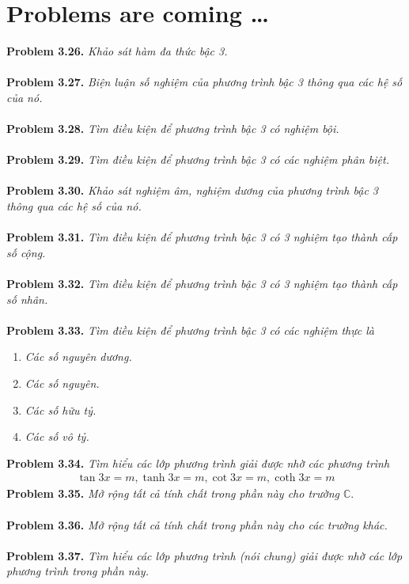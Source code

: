 \documentclass[a4paper,oneside]{book}
\numberwithin{equation}{chapter}
\begin{document}
\section{Problems are coming \ldots}
\textbf{Problem 3.26.} \textit{Khảo sát hàm đa thức bậc 3.}\\
\\
\textbf{Problem 3.27.} \textit{Biện luận số nghiệm của phương trình bậc 3 thông qua các hệ số của nó.}\\
\\
\textbf{Problem 3.28.} \textit{Tìm điều kiện để phương trình bậc 3 có nghiệm bội.}\\
\\
\textbf{Problem 3.29.} \textit{Tìm điều kiện để phương trình bậc 3 có các nghiệm phân biệt.}\\
\\
\textbf{Problem 3.30.} \textit{Khảo sát nghiệm âm, nghiệm dương của phương trình bậc 3 thông qua các hệ số của nó.}\\
\\
\textbf{Problem 3.31.} \textit{Tìm điều kiện để phương trình bậc 3 có 3 nghiệm tạo thành cấp số cộng.}\\
\\
\textbf{Problem 3.32.} \textit{Tìm điều kiện để phương trình bậc 3 có 3 nghiệm tạo thành cấp số nhân.}\\
\\
\textbf{Problem 3.33.} \textit{Tìm điều kiện để phương trình bậc 3 có các nghiệm thực là}
\begin{enumerate}
\item \textit{Các số nguyên dương.}
\item \textit{Các số nguyên.}
\item \textit{Các số hữu tỷ.}
\item \textit{Các số vô tỷ.}
\end{enumerate}
\textbf{Problem 3.34.} \textit{Tìm hiểu các lớp phương trình giải được nhờ các phương trình} 
\begin{align}
\tan 3x = m,\tanh 3x = m,\cot 3x = m,\coth 3x = m
\end{align}
\textbf{Problem 3.35.} \textit{Mở rộng tất cả tính chất trong phần này cho trường $\mathbb{C}$}.\\
\\
\textbf{Problem 3.36.} \textit{Mở rộng tất cả tính chất trong phần này cho các trường khác.}\\
\\
\textbf{Problem 3.37.} \textit{Tìm hiểu các lớp phương trình (nói chung) giải được nhờ các lớp phương trình trong phần này.}
\end{document}
